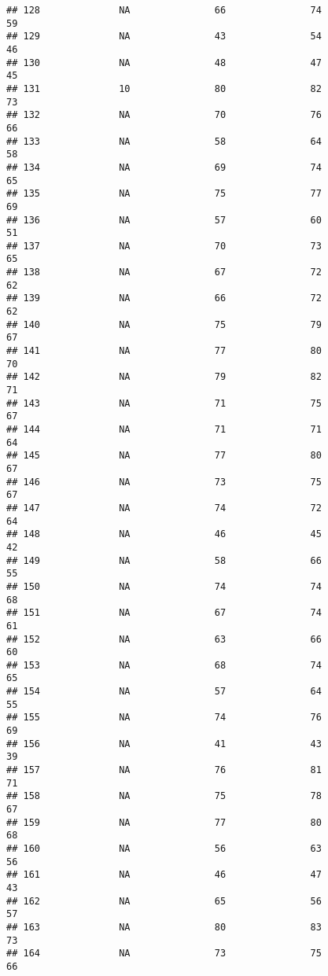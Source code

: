 \documentclass[]{article}
\begin{document}
\begin{verbatim}
## 128              NA               66               74             59
## 129              NA               43               54             46
## 130              NA               48               47             45
## 131              10               80               82             73
## 132              NA               70               76             66
## 133              NA               58               64             58
## 134              NA               69               74             65
## 135              NA               75               77             69
## 136              NA               57               60             51
## 137              NA               70               73             65
## 138              NA               67               72             62
## 139              NA               66               72             62
## 140              NA               75               79             67
## 141              NA               77               80             70
## 142              NA               79               82             71
## 143              NA               71               75             67
## 144              NA               71               71             64
## 145              NA               77               80             67
## 146              NA               73               75             67
## 147              NA               74               72             64
## 148              NA               46               45             42
## 149              NA               58               66             55
## 150              NA               74               74             68
## 151              NA               67               74             61
## 152              NA               63               66             60
## 153              NA               68               74             65
## 154              NA               57               64             55
## 155              NA               74               76             69
## 156              NA               41               43             39
## 157              NA               76               81             71
## 158              NA               75               78             67
## 159              NA               77               80             68
## 160              NA               56               63             56
## 161              NA               46               47             43
## 162              NA               65               56             57
## 163              NA               80               83             73
## 164              NA               73               75             66

\end{verbatim}
\end{document}
